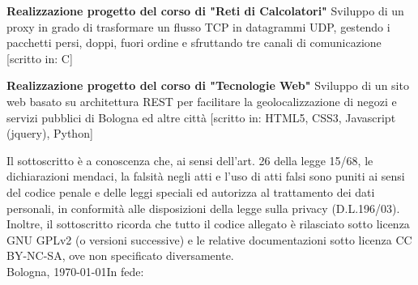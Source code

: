 \documentclass[11pt,a4paper]{moderncv}
\begin{document}
 {\textbf{Realizzazione progetto del corso di "Reti di Calcolatori"} \cite{reti}\newline Sviluppo di un proxy in grado di trasformare un flusso TCP in datagrammi UDP, gestendo i pacchetti persi, doppi, fuori ordine e sfruttando tre canali di comunicazione [scritto in: C]}

 {\textbf{Realizzazione progetto del corso di "Tecnologie Web"} \cite{progettotw} \cite{codicetw}\newline Sviluppo di un sito web basato su architettura REST per facilitare la geolocalizzazione di negozi e servizi pubblici di Bologna ed altre città [scritto in: HTML5, CSS3, Javascript (jquery), Python]}


    

\vspace{\fill}
{\footnotesize\noindent
Il sottoscritto è a conoscenza che, ai sensi dell'art. 26 della legge 15/68, le dichiarazioni mendaci, la falsità negli atti e l'uso di atti falsi sono puniti ai sensi del codice penale e delle leggi speciali ed autorizza al trattamento dei dati personali, in conformità alle disposizioni della legge sulla privacy (D.L.196/03). Inoltre, il sottoscritto ricorda che tutto il codice allegato è rilasciato sotto licenza GNU GPLv2 (o versioni successive) e le relative documentazioni sotto licenza CC BY-NC-SA, ove non specificato diversamente.}
\vspace*{0.8cm}\\
Bologna, \today\hfill In fede: 
\end{document}
